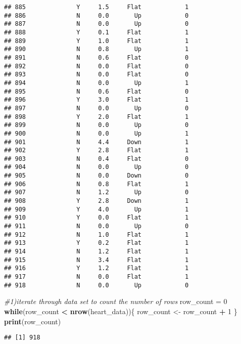 \documentclass[
]{article}
\newenvironment{Shaded}{\begin{snugshade}}{\end{snugshade}}
\newcommand{\CommentTok}[1]{\textcolor[rgb]{0.56,0.35,0.01}{\textit{#1}}}
\newcommand{\ControlFlowTok}[1]{\textcolor[rgb]{0.13,0.29,0.53}{\textbf{#1}}}
\newcommand{\DecValTok}[1]{\textcolor[rgb]{0.00,0.00,0.81}{#1}}
\newcommand{\FunctionTok}[1]{\textcolor[rgb]{0.13,0.29,0.53}{\textbf{#1}}}
\newcommand{\NormalTok}[1]{#1}
\newcommand{\OtherTok}[1]{\textcolor[rgb]{0.56,0.35,0.01}{#1}}
\newcommand{\SpecialCharTok}[1]{\textcolor[rgb]{0.81,0.36,0.00}{\textbf{#1}}}
\begin{document}
\begin{verbatim}
## 885              Y     1.5     Flat            1
## 886              N     0.0       Up            0
## 887              N     0.0       Up            0
## 888              Y     0.1     Flat            1
## 889              Y     1.0     Flat            1
## 890              N     0.8       Up            1
## 891              N     0.6     Flat            0
## 892              N     0.0     Flat            0
## 893              N     0.0     Flat            0
## 894              N     0.0       Up            1
## 895              N     0.6     Flat            0
## 896              Y     3.0     Flat            1
## 897              N     0.0       Up            0
## 898              Y     2.0     Flat            1
## 899              N     0.0       Up            0
## 900              N     0.0       Up            1
## 901              N     4.4     Down            1
## 902              Y     2.8     Flat            1
## 903              N     0.4     Flat            0
## 904              N     0.0       Up            0
## 905              N     0.0     Down            0
## 906              N     0.8     Flat            1
## 907              N     1.2       Up            0
## 908              Y     2.8     Down            1
## 909              Y     4.0       Up            1
## 910              Y     0.0     Flat            1
## 911              N     0.0       Up            0
## 912              N     1.0     Flat            1
## 913              Y     0.2     Flat            1
## 914              N     1.2     Flat            1
## 915              N     3.4     Flat            1
## 916              Y     1.2     Flat            1
## 917              N     0.0     Flat            1
## 918              N     0.0       Up            0
\end{verbatim}

\begin{Shaded}
\begin{Highlighting}[]
\CommentTok{\#1)iterate through data set to count the number of rows}
\NormalTok{row\_count }\OtherTok{=} \DecValTok{0}
\ControlFlowTok{while}\NormalTok{(row\_count }\SpecialCharTok{\textless{}} \FunctionTok{nrow}\NormalTok{(heart\_data))\{}
\NormalTok{  row\_count }\OtherTok{\textless{}{-}}\NormalTok{ row\_count }\SpecialCharTok{+} \DecValTok{1}
\NormalTok{\}}
\FunctionTok{print}\NormalTok{(row\_count)}
\end{Highlighting}
\end{Shaded}

\begin{verbatim}
## [1] 918
\end{verbatim}
\end{document}
